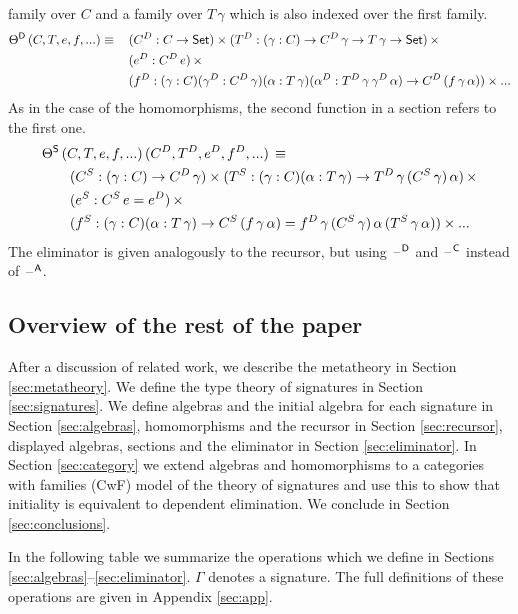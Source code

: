 \documentclass[acmsmall,review]{acmart}\settopmatter{printfolios=true,printccs=false,printacmref=false}
\begin{document}
family over $C$ and a family over $T\,\gamma$ which is also indexed
over the first family.
\begin{alignat*}{5}
  & \Theta^{\mathsf{D}}\,(C,T,e,f,...)\equiv\, && (C^D:C\rightarrow \mathsf{Set})\times(T^D:(\gamma:C)\rightarrow C^D\,\gamma\rightarrow T\,\gamma\rightarrow \mathsf{Set})\,\times \\
  & && (e^D:C^D\,e)\,\times \\
  & && (f^D:(\gamma:C)(\gamma^D:C^D\,\gamma)(\alpha:T\,\gamma)(\alpha^D:T^D\,\gamma\,\gamma^D\,\alpha)\rightarrow C^D\,(f\,\gamma\,\alpha))\times...
\end{alignat*}
As in the case of the homomorphisms, the second function in a section
refers to the first one.
\begin{alignat*}{5}
  & \Theta^{\mathsf{S}}\,(C,T,e,f,...)\,(C^D,T^D,e^D,f^D,...)\,\equiv \\
  & \hspace{2em} (C^S:(\gamma:C)\rightarrow C^D\,\gamma)\times(T^S:(\gamma:C)(\alpha:T\,\gamma)\rightarrow T^D\,\gamma\,(C^S\,\gamma)\,\alpha)\,\times \\
  & \hspace{2em} (e^S:C^S\,e=e^D)\,\times \\
  & \hspace{2em} (f^S:(\gamma:C)(\alpha:T\,\gamma)\rightarrow C^S\,(f\,\gamma\,\alpha)=f^D\,\gamma\,(C^S\,\gamma)\,\alpha\,(T^S\,\gamma\,\alpha))\times ...
\end{alignat*}
The eliminator is given analogously to the recursor, but using
$\mathord{\hspace{1pt}\text{--}\hspace{1pt}}^{\mathsf{D}}$ and $\mathord{\hspace{1pt}\text{--}\hspace{1pt}}^{\mathsf{C}}$ instead of $\mathord{\hspace{1pt}\text{--}\hspace{1pt}}^{\mathsf{A}}$.

\subsection{Overview of the rest of the paper}

After a discussion of related work, we describe the metatheory in
Section \ref{sec:metatheory}. We define the type theory of signatures
in Section \ref{sec:signatures}. We define algebras and the initial
algebra for each signature in Section \ref{sec:algebras},
homomorphisms and the recursor in Section \ref{sec:recursor},
displayed algebras, sections and the eliminator in Section
\ref{sec:eliminator}. In Section \ref{sec:category} we extend algebras
and homomorphisms to a categories with families (CwF) model of the
theory of signatures and use this to show that initiality
is equivalent to dependent elimination. We conclude in
Section \ref{sec:conclusions}.

In the following table we summarize the operations which we define in
Sections \ref{sec:algebras}--\ref{sec:eliminator}. $\Gamma$ denotes a
signature. The full definitions of these operations are given in
Appendix \ref{sec:app}.
\end{document}
